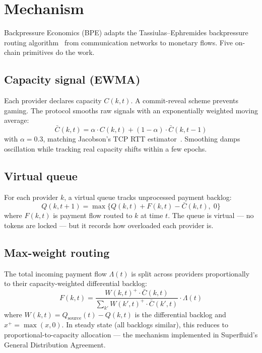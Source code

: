 \documentclass[10pt,twocolumn]{article}
\newcommand{\Csmooth}{\bar{C}}
\newcommand{\Craw}{C}
\begin{document}
\section{Mechanism}

Backpressure Economics (BPE) adapts the Tassiulas--Ephremides backpressure
routing algorithm~\cite{tassiulas1992stability} from communication networks
to monetary flows. Five on-chain primitives do the work.

\subsection{Capacity signal (EWMA)}

Each provider declares capacity $\Craw(k,t)$. A commit-reveal scheme prevents
gaming. The protocol smooths raw signals with an exponentially weighted moving
average:
\begin{equation}
\Csmooth(k,t) = \alpha \cdot \Craw(k,t) + (1-\alpha) \cdot \Csmooth(k,t-1)
\end{equation}
with $\alpha = 0.3$, matching Jacobson's TCP RTT estimator~\cite{jacobson1988congestion}.
Smoothing damps oscillation while tracking real capacity shifts within a few epochs.

\subsection{Virtual queue}

For each provider $k$, a virtual queue tracks unprocessed payment backlog:
\begin{equation}
Q(k,t\!+\!1) = \max\{Q(k,t) + F(k,t) - \Csmooth(k,t),\; 0\}
\end{equation}
where $F(k,t)$ is payment flow routed to $k$ at time $t$. The queue is virtual
--- no tokens are locked --- but it records how overloaded each provider is.

\subsection{Max-weight routing}

The total incoming payment flow $\Lambda(t)$ is split across providers
proportionally to their capacity-weighted differential backlog:
\begin{equation}
F(k,t) = \frac{W(k,t)^{+} \cdot \Csmooth(k,t)}
{\sum_{k'} W(k',t)^{+} \cdot \Csmooth(k',t)} \cdot \Lambda(t)
\end{equation}
where $W(k,t) = Q_{\text{source}}(t) - Q(k,t)$ is the differential backlog and
$x^{+} = \max(x,0)$. In steady state (all backlogs similar), this reduces to
proportional-to-capacity allocation --- the mechanism implemented in Superfluid's
General Distribution Agreement.
\end{document}
